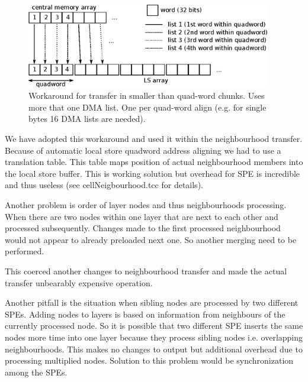 \begin{figure}
    \centering
    \includegraphics[width=0.95\textwidth]{data/multipleDMAList}
    \caption[Multiple DMA list workaround]
{
  Workaround for transfer in smaller than quad-word chunks.
  Uses more that one DMA list.
  One per quad-word align (e.g. for single bytes 16 DMA lists are needed).
}
    \label{fg:multipleDMAList}
\end{figure}

We have adopted this workaround and used it within the neighbourhood transfer.
Because of automatic local store quadword address aligning we had to use a translation table.
This table maps position of actual neighbourhood members into the local store buffer.
This is working solution but overhead for SPE is incredible and thus useless (see cellNeigbourhood.tcc for details).

\par
\label{neighbourhoodDependecy}
Another problem is order of layer nodes and thus neighbourhoods processing.
When there are two nodes within one layer that are next to each other and processed subsequently.
Changes made to the first processed neighbourhood would not appear to already preloaded next one.
So another merging need to be performed.

\par
This coerced another changes to neighbourhood transfer and made the actual transfer unbearably expensive operation.

\par
\label{workDependecy}
Another pitfall is the situation when sibling nodes are processed by two different SPEs.
Adding nodes to layers is based on information from neighbours of the currently processed node.
So it is possible that two different SPE inserts the same nodes more time into one layer because they process sibling nodes i.e. overlapping neighbourhoods.
This makes no changes to output but additional overhead due to processing multiplied nodes.
Solution to this problem would be synchronization among the SPEs.


